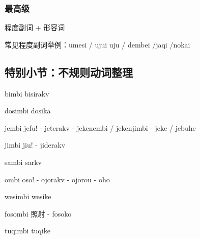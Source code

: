 \subsubsection{最高级}

程度副词 + 形容词

常见程度副词举例：umesi / ujui uju / dembei /jaqi /nokai

\subsection{特别小节：不规则动词整理}

\begin{des}
    \item[bimbi] bisirakv 
    \item[dosimbi] dosika 
    \item[jembi] jefu! - jeterakv - jekenembi / jekenjimbi - jeke / jebuhe
    \item[jimbi] jiu! - jiderakv
    \item[sambi] sarkv 
    \item[ombi] oso! - ojorakv - ojorou - oho
    \item[wesimbi] wesike 
    \item[fosombi]照射 - fosoko
    \item[tuqimbi] tuqike  
\end{des}